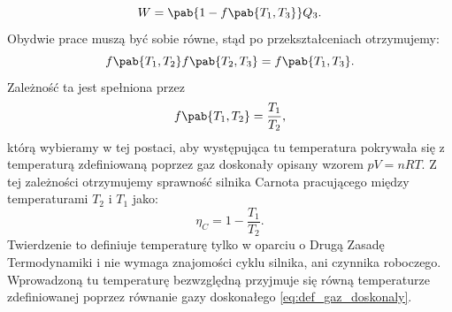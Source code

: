 \begin{equation}
W = \pab{1 - f\pab{T_1, T_3}}Q_3.
\end{equation}
Obydwie prace muszą być sobie równe, stąd po przekształceniach otrzymujemy:
\begin{equation}
f\pab{T_1, T_2}f\pab{T_2, T_3} = f\pab{T_1, T_3}.
\end{equation}
Zależność ta jest spełniona przez
\begin{equation}
f\pab{T_1, T_2} = \frac{T_1}{T_2},
\end{equation}
którą wybieramy w tej postaci, aby występująca tu temperatura pokrywała się z temperaturą zdefiniowaną poprzez gaz doskonały opisany wzorem $pV = nRT$. Z tej zależności otrzymujemy sprawność silnika Carnota pracującego między temperaturami $T_2$ i $T_1$ jako:
\begin{equation}\label{eq:sprawnosc_carnot}
\eta_C = 1 - \frac{T_1}{T_2}.
\end{equation}
Twierdzenie to definiuje temperaturę tylko w oparciu o Drugą Zasadę Termodynamiki i nie wymaga znajomości cyklu silnika, ani czynnika roboczego. Wprowadzoną tu temperaturę bezwzględną przyjmuje się równą temperaturze zdefiniowanej poprzez równanie gazy doskonałego \eqref{eq:def_gaz_doskonaly}.
